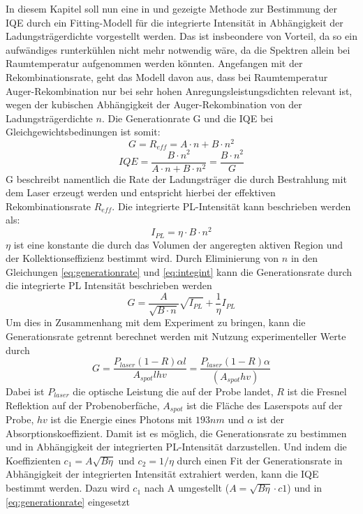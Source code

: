 \raggedright
In diesem Kapitel soll nun eine in \cite{doi:10.1063/1.3100773} und \cite{doi:10.1063/1.4917540} gezeigte Methode zur Bestimmung der IQE durch ein Fitting-Modell für die integrierte Intensität in Abhängigkeit der Ladungsträgerdichte vorgestellt werden. Das ist insbeondere von Vorteil, da so ein aufwändiges runterkühlen nicht mehr notwendig wäre, da die Spektren allein bei Raumtemperatur aufgenommen werden könnten. 
\newline
Angefangen mit der Rekombinationsrate, geht das Modell davon aus,
dass bei Raumtemperatur Auger-Rekombination nur bei sehr hohen Anregungsleistungsdichten relevant ist, wegen der kubischen Abhängigkeit der Auger-Rekombination von der Ladungsträgerdichte $n$. Die Generationrate G und die IQE bei Gleichgewichtsbedinungen ist somit:
\begin{equation}
    G = R_{eff} = A \cdot n + B \cdot n^2
    \label{eq:generationrate}
\end{equation}  
\begin{equation}
    IQE = \frac{B\cdot n^2}{A \cdot n + B \cdot n^2} = \frac{B\cdot n^2}{G}
    \label{eq:iqe2}
\end{equation}  
G beschreibt namentlich die Rate der Ladungsträger die durch Bestrahlung mit dem Laser erzeugt werden und entspricht hierbei der effektiven Rekombinationsrate $R_{eff}$.
Die integrierte PL-Intensität kann beschrieben werden als:
\begin{equation}
    I_{PL} = \eta \cdot B \cdot n^2
    \label{eq:integint}
\end{equation} 
$\eta$ ist eine konstante die durch das Volumen der angeregten aktiven Region und der Kollektionseffizienz bestimmt wird. Durch Eliminierung von $n$ in den Gleichungen \ref{eq:generationrate} und \ref{eq:integint} kann die Generationsrate durch die integrierte PL Intensität beschrieben werden
\begin{equation}
    G = \frac{A}{\sqrt{B\cdot n}}\sqrt{I_{PL}} + \frac{1}{\eta} I_{PL}
\end{equation} 
Um dies in Zusammenhang mit dem Experiment zu bringen, kann die Generationsrate getrennt berechnet werden mit Nutzung experimenteller Werte durch 
\begin{equation}
    G = \frac{P_{laser} (1-R)\alpha l}{A_{spot} l h v} = \frac{P_{laser}(1-R) \alpha }{ (A_{spot} h v)}
\end{equation} 
Dabei ist $P_{laser}$ die optische Leistung die auf der Probe landet, $R$ ist die Fresnel Reflektion auf der Probenoberfäche, $A_{spot}$ ist die Fläche des Laserspots auf der Probe, $h v$ ist die Energie eines Photons mit $193 nm$ und $\alpha$ ist der Absorptionskoeffizient. Damit ist es möglich, die Generationsrate zu bestimmen und in Abhängigkeit der integrierten PL-Intensität darzustellen. Und indem die Koeffizienten $c_1 = A \sqrt{B  \eta}$ und $c_2 = 1 / \eta$ durch einen Fit der Generationsrate in Abhängigkeit der integrierten Intensität extrahiert werden, kann die IQE bestimmt werden. Dazu wird $c_1$ nach A umgestellt ($A = \sqrt{B \eta} \cdot c1$) und in \ref{eq:generationrate} eingesetzt

